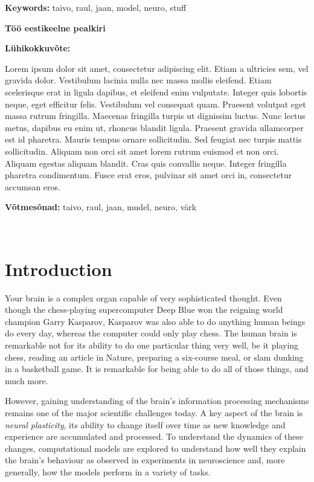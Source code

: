 \documentclass[a4paper,12pt]{report}
\theoremstyle{definition}
\begin{document}
\textbf{Keywords:} taivo, raul, jaan, model, neuro, stuff

\vspace{1.5cm}



{\textbf
{\Large Töö eestikeelne pealkiri}}

\textbf{Lühikokkuvõte:}

Lorem ipsum dolor sit amet, consectetur adipiscing elit. Etiam a ultricies sem, vel gravida dolor. Vestibulum lacinia nulla nec massa mollis eleifend. Etiam scelerisque erat in ligula dapibus, et eleifend enim vulputate. Integer quis lobortis neque, eget efficitur felis. Vestibulum vel consequat quam. Praesent volutpat eget massa rutrum fringilla. Maecenas fringilla turpis ut dignissim luctus. Nunc lectus metus, dapibus eu enim ut, rhoncus blandit ligula. Praesent gravida ullamcorper est id pharetra. Mauris tempus ornare sollicitudin. Sed feugiat nec turpis mattis sollicitudin. Aliquam non orci sit amet lorem rutrum euismod et non orci. Aliquam egestas aliquam blandit. Cras quis convallis neque. Integer fringilla pharetra condimentum. Fusce erat eros, pulvinar sit amet orci in, consectetur accumsan eros.

\textbf{Võtmesõnad:} taivo, raul, jaan, mudel, neuro, värk


\
\thispagestyle{empty}
\pagebreak

\tableofcontents
\newpage



\chapter*{Introduction}


Your brain is a complex organ capable of very sophisticated thought. Even though the chess-playing supercomputer Deep Blue won the reigning world champion Garry Kasparov, Kasparov was also able to do anything human beings do every day, whereas the computer could only play chess. The human brain is remarkable not for its ability to do one particular thing very well, be it playing chess, reading an article in Nature, preparing a six-course meal, or slam dunking in a basketball game. It is remarkable for being able to do all of those things, and much more.

However, gaining understanding of the brain's information processing mechanisms remains one of the major scientific challenges today. A key aspect of the brain is \emph{neural plasticity}, its ability to change itself over time as new knowledge and experience are accumulated and processed. To understand the dynamics of these changes, computational models are explored to understand how well they explain the brain's behaviour as observed in experiments in neuroscience and, more generally, how the models perform in a variety of tasks.
\end{document}
